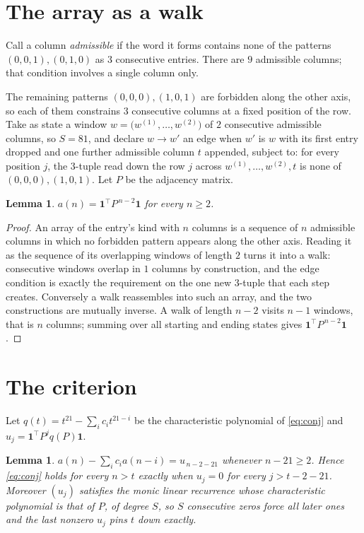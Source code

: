 \documentclass[11pt,a4paper]{article}
\theoremstyle{plain}
\newtheorem{lemma}[theorem]{Lemma}
\theoremstyle{definition}
\begin{document}
\section{The array as a walk}

Call a column \emph{admissible} if the word it forms contains none of the patterns
$(0,0,1), (0,1,0)$ as $3$ consecutive entries. There are $9$ admissible columns; that condition
involves a single column only.

The remaining patterns $(0,0,0), (1,0,1)$ are forbidden along the other axis, so each of them
constrains $3$ consecutive columns at a fixed position of the row. Take as state a
window $w=\bigl(w^{(1)},\dots,w^{(2)}\bigr)$ of $2$ consecutive admissible
columns, so $S=81$, and declare $w\to w'$ an edge when $w'$ is $w$ with its first entry
dropped and one further admissible column $t$ appended, subject to: for every position
$j$, the $3$-tuple read down the row $j$ across $w^{(1)},\dots,w^{(2)},t$
is none of $(0,0,0), (1,0,1)$. Let $P$ be the adjacency matrix.

\begin{lemma}\label{lem:walk}
$a(n)=\mathbf{1}^{\!\top}P^{\,n-2}\mathbf{1}$ for every $n\ge2$.
\end{lemma}

\begin{proof}
An array of the entry's kind with $n$ columns is a sequence of $n$ admissible columns in
which no forbidden pattern appears along the other axis. Reading it as the sequence of its
overlapping windows of length $2$ turns it into a walk: consecutive windows overlap in
$1$ columns by construction, and the edge condition is exactly the requirement on the one
new $3$-tuple that each step creates. Conversely a walk reassembles into such an array,
and the two constructions are mutually inverse. A walk of length $n-2$ visits $n-1$
windows, that is $n$ columns; summing over all starting and ending states gives
$\mathbf{1}^{\!\top}P^{\,n-2}\mathbf{1}$.
\end{proof}

\section{The criterion}

Let $q(t)=t^{21}-\sum_i c_i t^{21-i}$ be the characteristic polynomial of
\eqref{eq:conj} and $u_j=\mathbf{1}^{\!\top}P^{j}q(P)\mathbf{1}$.

\begin{lemma}\label{lem:crit}
$a(n)-\sum_i c_i a(n-i)=u_{\,n-2-21}$ whenever $n-21\ge2$. Hence
\eqref{eq:conj} holds for every $n>t$ exactly when $u_j=0$ for every
$j>t-2-21$. Moreover $(u_j)$ satisfies the monic linear recurrence whose
characteristic polynomial is that of $P$, of degree $S$, so $S$ consecutive zeros force all
later ones and the last nonzero $u_j$ pins $t$ down exactly.
\end{lemma}
\end{document}
